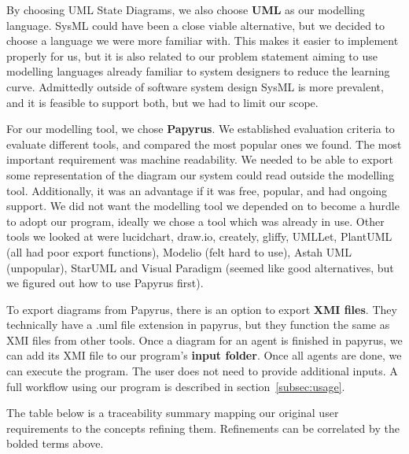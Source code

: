 \documentclass[11pt]{article}
\begin{document}
    By choosing UML State Diagrams, we also choose \textbf{UML} as our modelling language.
    SysML could have been a close viable alternative, but we decided to choose a language we were more familiar with.
    This makes it easier to implement properly for us,
    but it is also related to our problem statement aiming to use modelling languages already familiar to system designers to reduce the learning curve.
    Admittedly outside of software system design SysML is more prevalent, and it is feasible to support both, but we had to limit our scope.

    For our modelling tool, we chose \textbf{Papyrus}.
    We established evaluation criteria to evaluate different tools, and compared the most popular ones we found.
    The most important requirement was machine readability.
    We needed to be able to export some representation of the diagram our system could read outside the modelling tool.
    Additionally, it was an advantage if it was free, popular, and had ongoing support.
    We did not want the modelling tool we depended on to become a hurdle to adopt our program,
    ideally we chose a tool which was already in use.
    Other tools we looked at were lucidchart, draw.io, creately, gliffy, UMLLet, PlantUML (all had poor export functions),
    Modelio (felt hard to use), Astah UML (unpopular),
    StarUML and Visual Paradigm (seemed like good alternatives, but we figured out how to use Papyrus first).

    To export diagrams from Papyrus, there is an option to export \textbf{XMI files}.
    They technically have a .uml file extension in papyrus, but they function the same as XMI files from other tools.
    Once a diagram for an agent is finished in papyrus, we can add its XMI file to our program's \textbf{input folder}.
    Once all agents are done, we can execute the program.
    The user does not need to provide additional inputs.
    A full workflow using our program is described in section~\ref{subsec:usage}.

    The table below is a traceability summary mapping our original user requirements to the concepts refining them.
    Refinements can be correlated by the bolded terms above.
\end{document}
